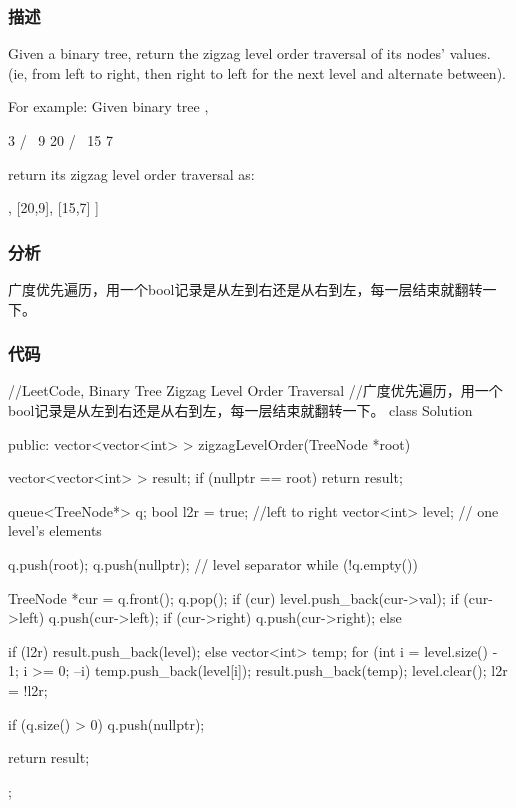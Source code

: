 \subsubsection{描述}
Given a binary tree, return the zigzag level order traversal of its nodes' values. (ie, from left to right, then right to left for the next level and alternate between).

For example:
Given binary tree ,
\begin{Code}
    3
   / \
  9  20
    /  \
   15   7
\end{Code}
return its zigzag level order traversal as:
\begin{Code}
[
  [3],
  [20,9],
  [15,7]
]
\end{Code}


\subsubsection{分析}
广度优先遍历，用一个bool记录是从左到右还是从右到左，每一层结束就翻转一下。


\subsubsection{代码}
\begin{Code}
//LeetCode, Binary Tree Zigzag Level Order Traversal
//广度优先遍历，用一个bool记录是从左到右还是从右到左，每一层结束就翻转一下。
class Solution {
public:
    vector<vector<int> > zigzagLevelOrder(TreeNode *root) {
        vector<vector<int> > result;
        if (nullptr == root) return result;

        queue<TreeNode*> q;
        bool l2r = true;  //left to right
        vector<int> level;  // one level's elements

        q.push(root);
        q.push(nullptr);  // level separator
        while (!q.empty()) {
            TreeNode *cur = q.front();
            q.pop();
            if (cur) {
                level.push_back(cur->val);
                if (cur->left) q.push(cur->left);
                if (cur->right) q.push(cur->right);
            } else {
                if (l2r) {
                    result.push_back(level);
                } else {
                    vector<int> temp;
                    for (int i = level.size() - 1; i >= 0; --i) {
                        temp.push_back(level[i]);
                    }
                    result.push_back(temp);
                }
                level.clear();
                l2r = !l2r;

                if (q.size() > 0) q.push(nullptr);
            }
        }

        return result;
    }
};
\end{Code}


